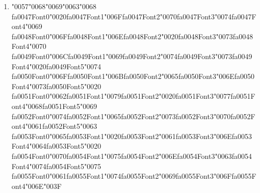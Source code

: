 \documentclass[12pt]{article}
\begin{document}
\begin{enumerate}[label=Q\arabic*.]
\begin{enumerate}[label=(\Alph*)]
    \item A method that classifies named entities and links them to a knowledge base
    \item A technique that labels words with their parts of speech and morphological features 
\end{enumerate}
\item {\char"0057}{\char"0068}{\char"0069}{\char"0063}{\char"0068} {\csname fa0047Font0\endcsname\char"0020}{\csname fa0047Font1\endcsname\char"006F}{\csname fa0047Font2\endcsname\char"0070}{\csname fa0047Font3\endcsname\char"0074}{\csname fa0047Font4\endcsname\char"0069} {\csname fa0048Font0\endcsname\char"006F}{\csname fa0048Font1\endcsname\char"006E}{\csname fa0048Font2\endcsname\char"0020}{\csname fa0048Font3\endcsname\char"0073}{\csname fa0048Font4\endcsname\char"0070} {\csname fa0049Font0\endcsname\char"006C}{\csname fa0049Font1\endcsname\char"0069}{\csname fa0049Font2\endcsname\char"0074}{\csname fa0049Font3\endcsname\char"0073}{\csname fa0049Font4\endcsname\char"0020}{\csname fa0049Font5\endcsname\char"0074} {\csname fa0050Font0\endcsname\char"006F}{\csname fa0050Font1\endcsname\char"006B}{\csname fa0050Font2\endcsname\char"0065}{\csname fa0050Font3\endcsname\char"006E}{\csname fa0050Font4\endcsname\char"0073}{\csname fa0050Font5\endcsname\char"0020} {\csname fa0051Font0\endcsname\char"0062}{\csname fa0051Font1\endcsname\char"0079}{\csname fa0051Font2\endcsname\char"0020}{\csname fa0051Font3\endcsname\char"0077}{\csname fa0051Font4\endcsname\char"0068}{\csname fa0051Font5\endcsname\char"0069} {\csname fa0052Font0\endcsname\char"0074}{\csname fa0052Font1\endcsname\char"0065}{\csname fa0052Font2\endcsname\char"0073}{\csname fa0052Font3\endcsname\char"0070}{\csname fa0052Font4\endcsname\char"0061}{\csname fa0052Font5\endcsname\char"0063} {\csname fa0053Font0\endcsname\char"0065}{\csname fa0053Font1\endcsname\char"0020}{\csname fa0053Font2\endcsname\char"0061}{\csname fa0053Font3\endcsname\char"006E}{\csname fa0053Font4\endcsname\char"0064}{\csname fa0053Font5\endcsname\char"0020} {\csname fa0054Font0\endcsname\char"0070}{\csname fa0054Font1\endcsname\char"0075}{\csname fa0054Font2\endcsname\char"006E}{\csname fa0054Font3\endcsname\char"0063}{\csname fa0054Font4\endcsname\char"0074}{\csname fa0054Font5\endcsname\char"0075} {\csname fa0055Font0\endcsname\char"0061}{\csname fa0055Font1\endcsname\char"0074}{\csname fa0055Font2\endcsname\char"0069}{\csname fa0055Font3\endcsname\char"006F}{\csname fa0055Font4\endcsname\char"006E}{\char"003F}
\begin{enumerate}[label=(\Alph*)]

\end{enumerate}
\end{enumerate}
\end{document}
